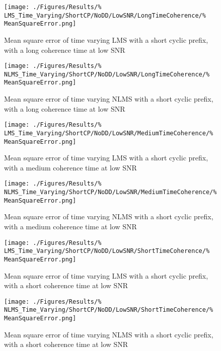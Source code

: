 \begin{figure}[ht]
	\centering
	\begin{minipage}{0.49\textwidth}
		\centering
		\texttt{[image: ./Figures/Results/\%
	LMS\_Time\_Varying/ShortCP/NoDD/LowSNR/LongTimeCoherence/\%
	MeanSquareError.png]}
		\caption{Mean square error of time varying LMS with a 
		short cyclic prefix, with a long coherence time at 
		low SNR}
	\end{minipage}
	\begin{minipage}{0.49\textwidth}
		\centering
		\texttt{[image: ./Figures/Results/\%
	NLMS\_Time\_Varying/ShortCP/NoDD/LowSNR/LongTimeCoherence/\%
	MeanSquareError.png]}
		\caption{Mean square error of time varying NLMS with 
		a short cyclic prefix, with a long coherence time 
		at low SNR}
	\end{minipage}
\end{figure}

\begin{figure}[ht]
	\centering
	\begin{minipage}{0.49\textwidth}
		\centering
		\texttt{[image: ./Figures/Results/\%
	LMS\_Time\_Varying/ShortCP/NoDD/LowSNR/MediumTimeCoherence/\%
	MeanSquareError.png]}
		\caption{Mean square error of time varying LMS with a 
		short cyclic prefix, with a medium coherence time at 
		low SNR}
	\end{minipage}
	\begin{minipage}{0.49\textwidth}
		\centering
		\texttt{[image: ./Figures/Results/\%
	NLMS\_Time\_Varying/ShortCP/NoDD/LowSNR/MediumTimeCoherence/\%
	MeanSquareError.png]}
		\caption{Mean square error of time varying NLMS with 
		a short cyclic prefix, with a medium coherence 
		time at low SNR}
	\end{minipage}
\end{figure}

\begin{figure}[ht]
	\centering
	\begin{minipage}{0.49\textwidth}
		\centering
		\texttt{[image: ./Figures/Results/\%
	LMS\_Time\_Varying/ShortCP/NoDD/LowSNR/ShortTimeCoherence/\%
	MeanSquareError.png]}
		\caption{Mean square error of time varying LMS with a 
		short cyclic prefix, with a short coherence time at 
		low SNR}
	\end{minipage}
	\begin{minipage}{0.49\textwidth}
		\centering
		\texttt{[image: ./Figures/Results/\%
	NLMS\_Time\_Varying/ShortCP/NoDD/LowSNR/ShortTimeCoherence/\%
	MeanSquareError.png]}
		\caption{Mean square error of time varying NLMS with 
		a short cyclic prefix, with a short coherence time 
		at low SNR}
	\end{minipage}
\end{figure}

